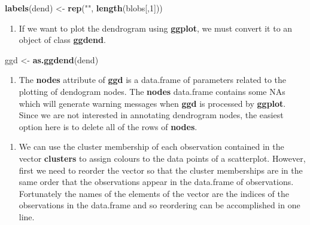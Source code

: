 \documentclass[]{book}
\newenvironment{Shaded}{\begin{snugshade}}{\end{snugshade}}
\newcommand{\KeywordTok}[1]{\textcolor[rgb]{0.13,0.29,0.53}{\textbf{{#1}}}}
\newcommand{\DecValTok}[1]{\textcolor[rgb]{0.00,0.00,0.81}{{#1}}}
\newcommand{\StringTok}[1]{\textcolor[rgb]{0.31,0.60,0.02}{{#1}}}
\newcommand{\NormalTok}[1]{{#1}}
\providecommand{\tightlist}{%
  \setlength{\itemsep}{0pt}\setlength{\parskip}{0pt}}
\theoremstyle{definition}
\theoremstyle{definition}
\theoremstyle{definition}
\theoremstyle{remark}
\begin{document}
\begin{Shaded}
\begin{Highlighting}[]
\KeywordTok{labels}\NormalTok{(dend) <-}\StringTok{ }\KeywordTok{rep}\NormalTok{(}\StringTok{""}\NormalTok{, }\KeywordTok{length}\NormalTok{(blobs[,}\DecValTok{1}\NormalTok{]))}
\end{Highlighting}
\end{Shaded}

\begin{enumerate}
\def\labelenumi{\arabic{enumi}.}
\setcounter{enumi}{8}
\tightlist
\item
  If we want to plot the dendrogram using \textbf{ggplot}, we must
  convert it to an object of class \textbf{ggdend}.
\end{enumerate}

\begin{Shaded}
\begin{Highlighting}[]
\NormalTok{ggd <-}\StringTok{ }\KeywordTok{as.ggdend}\NormalTok{(dend)}
\end{Highlighting}
\end{Shaded}

\begin{enumerate}
\def\labelenumi{\arabic{enumi}.}
\setcounter{enumi}{9}
\tightlist
\item
  The \textbf{nodes} attribute of \textbf{ggd} is a data.frame of
  parameters related to the plotting of dendogram nodes. The
  \textbf{nodes} data.frame contains some NAs which will generate
  warning messages when \textbf{ggd} is processed by \textbf{ggplot}.
  Since we are not interested in annotating dendrogram nodes, the
  easiest option here is to delete all of the rows of \textbf{nodes}.
\end{enumerate}

\begin{Shaded}
\end{Shaded}

\begin{enumerate}
\def\labelenumi{\arabic{enumi}.}
\setcounter{enumi}{10}
\tightlist
\item
  We can use the cluster membership of each observation contained in the
  vector \textbf{clusters} to assign colours to the data points of a
  scatterplot. However, first we need to reorder the vector so that the
  cluster memberships are in the same order that the observations appear
  in the data.frame of observations. Fortunately the names of the
  elements of the vector are the indices of the observations in the
  data.frame and so reordering can be accomplished in one line.
\end{enumerate}
\end{document}
